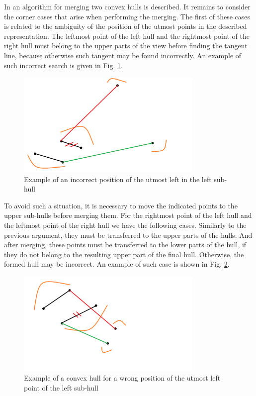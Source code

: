 \documentclass[a4paper,english,numberwithinsect,notab]{eurocg20-submission}
\begin{document}
	In \cite{overmars} an algorithm for merging two convex hulls is described. It remains to consider the corner cases that arise when performing the merging. The first of these cases is related to the ambiguity of the position of the utmost points in the described representation. The leftmost point of the left hull and the rightmost point of the right hull must belong to the upper parts of the view before finding the tangent line, because otherwise such tangent may be found incorrectly. An example of such incorrect search is given in Fig. \ref{fig:incorect_search}.
	
	\begin{figure}[t]
		\centering
		\includegraphics[width=0.8\textwidth, height=0.3\textheight]{incorect_search}
		\caption{Example of an incorrect position of the utmost left in the left sub-hull}
		\label{fig:incorect_search}
	\end{figure}
	
	To avoid such a situation, it is necessary to move the indicated points to the upper sub-hulls before merging them. For the rightmost point of the left hull and the leftmost point of the right hull we have the following cases. Similarly to the previous argument, they must be transferred to the upper parts of the hulls. And after merging, these points must be transferred to the lower parts of the hull, if they do not belong to the resulting upper part of the final hull. Otherwise, the formed hull may be incorrect. An example of such case is shown in Fig. \ref{fig:incorect_edge_points}.
	
	
	\begin{figure}[t]
		\centering
		\includegraphics[width=0.8\textwidth, height=0.3\textheight]{incorect_edge_points}
		\caption{Example of a convex hull for a wrong position of the utmost left point of the left sub-hull}
		\label{fig:incorect_edge_points}
	\end{figure}
	
\end{document}
